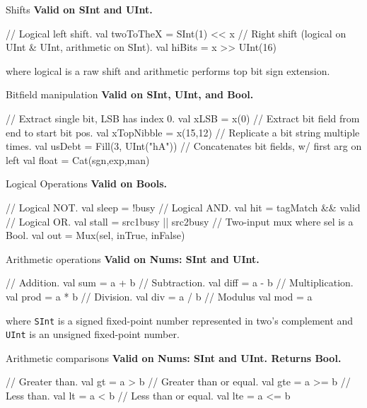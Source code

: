 \documentclass[xcolor=pdflatex,dvipsnames,table]{beamer}
\begin{document}
\begin{frame}[fragile]{Shifts}
\textbf{Valid on SInt and UInt.}
\begin{scala}
// Logical left shift.
val twoToTheX = SInt(1) << x   
// Right shift (logical on UInt & UInt, arithmetic on SInt).
val hiBits    = x >> UInt(16) 
\end{scala}
\noindent
where logical is a raw shift and arithmetic performs top bit sign extension.
\end{frame}

\begin{frame}[fragile]{Bitfield manipulation}
\textbf{Valid on SInt, UInt, and Bool.}
\begin{scala}
// Extract single bit, LSB has index 0.
val xLSB       = x(0)                
// Extract bit field  from end to start bit pos. 
val xTopNibble = x(15,12)            
// Replicate a bit string multiple times.
val usDebt     = Fill(3, UInt("hA")) 
// Concatenates bit fields, w/ first arg on left
val float      = Cat(sgn,exp,man)    
\end{scala}
\end{frame}

\begin{frame}[fragile]{Logical Operations}
\textbf{Valid on Bools. }
\begin{scala}
// Logical NOT. 
val sleep = !busy                     
// Logical AND.
val hit   = tagMatch && valid         
// Logical OR.
val stall = src1busy || src2busy      
// Two-input mux where sel is a Bool.  
val out   = Mux(sel, inTrue, inFalse) 
\end{scala}
\end{frame}

\begin{frame}[fragile]{Arithmetic operations}
\textbf{Valid on Nums: SInt and UInt. }
\begin{scala}
// Addition. 
val sum  = a + b  
// Subtraction.
val diff = a - b  
// Multiplication. 
val prod = a * b  
// Division.
val div  = a / b  
// Modulus
val mod  = a %
\end{scala}
\noindent
where \verb+SInt+ is a signed fixed-point number represented in two's complement and \verb+UInt+ is an unsigned fixed-point number. 
\end{frame}

\begin{frame}[fragile]{Arithmetic comparisons}
\textbf{Valid on Nums: SInt and UInt. Returns Bool.}
\begin{scala}
// Greater than.
val gt  = a > b   
// Greater than or equal.
val gte = a >= b  
// Less than.
val lt  = a < b   
// Less than or equal.
val lte = a <= b  
\end{scala}
\end{frame}
\end{document}
